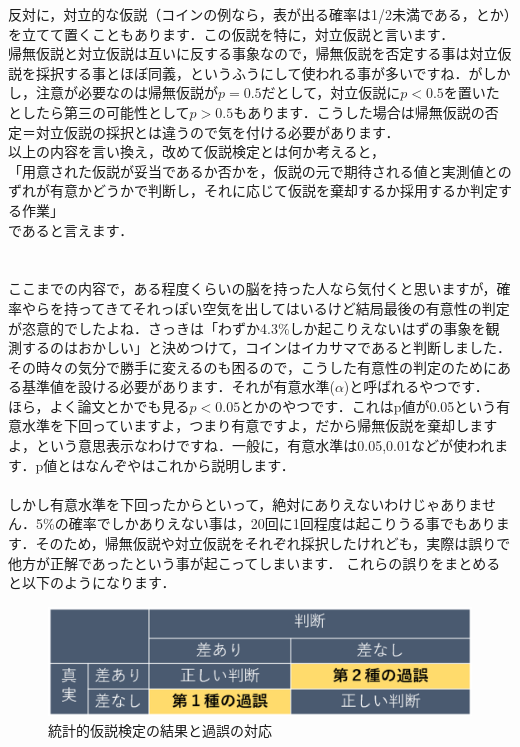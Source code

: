 \documentclass[11pt,a4paper]{ujreport} 	%
\begin{document}
反対に，対立的な仮説（コインの例なら，表が出る確率は1/2未満である，とか）を立てて置くこともあります．この仮説を特に，対立仮説と言います．\\

帰無仮説と対立仮説は互いに反する事象なので，帰無仮説を否定する事は対立仮説を採択する事とほぼ同義，というふうにして使われる事が多いですね．がしかし，注意が必要なのは帰無仮説が$p=0.5$だとして，対立仮説に$p<0.5$を置いたとしたら第三の可能性として$p>0.5$もあります．こうした場合は帰無仮説の否定＝対立仮説の採択とは違うので気を付ける必要があります．\\


以上の内容を言い換え，改めて仮説検定とは何か考えると，\\
「用意された仮説が妥当であるか否かを，仮説の元で期待される値と実測値とのずれが有意かどうかで判断し，それに応じて仮説を棄却するか採用するか判定する作業」\\
であると言えます．\\
\\
\\

ここまでの内容で，ある程度くらいの脳を持った人なら気付くと思いますが，確率やらを持ってきてそれっぽい空気を出してはいるけど結局最後の有意性の判定が恣意的でしたよね．さっきは「わずか4.3\%しか起こりえないはずの事象を観測するのはおかしい」と決めつけて，コインはイカサマであると判断しました．\\

その時々の気分で勝手に変えるのも困るので，こうした有意性の判定のためにある基準値を設ける必要があります．それが有意水準($\alpha$)と呼ばれるやつです．\\

ほら，よく論文とかでも見る$p<0.05$とかのやつです．これはp値が0.05という有意水準を下回っていますよ，つまり有意ですよ，だから帰無仮説を棄却しますよ，という意思表示なわけですね．一般に，有意水準は0.05,0.01などが使われます．p値とはなんぞやはこれから説明します．\\
\\

しかし有意水準を下回ったからといって，絶対にありえないわけじゃありません．5\%の確率でしかありえない事は，20回に1回程度は起こりうる事でもあります．そのため，帰無仮説や対立仮説をそれぞれ採択したけれども，実際は誤りで他方が正解であったという事が起こってしまいます．
これらの誤りをまとめると以下のようになります．

\begin{figure}[H]
  \includegraphics[width=15cm]{../figures/miss.eps}
  \caption{統計的仮説検定の結果と過誤の対応}
\end{figure}
\end{document}
